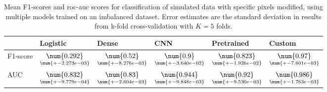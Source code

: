 \begin{table}
\centering
\caption{
Mean F1-scores and roc-auc scores for classification of simulated data with specific pixels
modified, using multiple models trained on an imbalanced dataset. Error estimates are the 
standard deviation in results from k-fold cross-validation with $K=5$ folds.
}
\label{tab:classification-simulated-pixelmod-f1-auc}
\begin{tabular}{llllll}
\toprule
{} &                                            Logistic &                                              Dense &                                                 CNN &                                          Pretrained &                                              Custom \\
\midrule
F1-score &  $\underset{\num{+- 2.273e-03 }  }{\num{ 0.292 } }$ &  $\underset{\num{+- 8.276e-03 }  }{\num{ 0.52 } }$ &  $\underset{\num{+- 3.640e-02 }  }{\num{ 0.9 } }$ &  $\underset{\num{+- 1.926e-02 }  }{\num{ 0.823 } }$ &  $\underset{\num{+- 7.601e-03 }  }{\num{ 0.97 } }$ \\
AUC      &  $\underset{\num{+- 9.779e-04 }  }{\num{ 0.832 } }$ &  $\underset{\num{+- 2.604e-03 }  }{\num{ 0.83 } }$ &  $\underset{\num{+- 9.848e-03 }  }{\num{ 0.944 } }$ &  $\underset{\num{+- 9.530e-03 }  }{\num{ 0.92 } }$ &  $\underset{\num{+- 1.763e-03 }  }{\num{ 0.986 } }$ \\
\bottomrule
\end{tabular}
\end{table}

